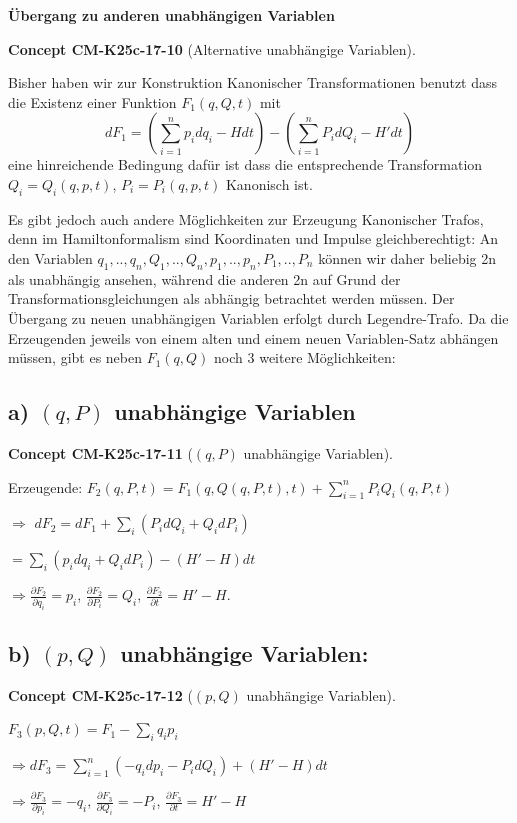 \documentclass[10pt, letterpaper]{article}
\newcommand{\CustomHeading}[3]{%
  \par\medskip\noindent%
  \textbf{#1 #2} \textnormal{(#3)}.\enskip%
}
\newenvironment{CONC}[2]{\begin{unitbox}\CustomHeading{Concept}{#1}{#2}}{\end{unitbox}}
\begin{document}
\textbf{Übergang zu anderen unabhängigen Variablen}

\begin{CONC}{CM-K25c-17-10}{Alternative unabhängige Variablen}
Bisher haben wir zur Konstruktion Kanonischer Transformationen benutzt dass die Existenz einer Funktion $F_1(q,Q,t)$ mit
\[dF_1 = \left(\sum_{i=1}^n p_i dq_i - H dt\right) - \left(\sum_{i=1}^n P_i dQ_i - H' dt\right)\]
eine hinreichende Bedingung dafür ist dass die entsprechende Transformation $Q_i = Q_i(q,p,t)$, $P_i = P_i(q,p,t)$ Kanonisch ist.

Es gibt jedoch auch andere Möglichkeiten zur Erzeugung Kanonischer Trafos, denn im Hamiltonformalism sind Koordinaten und Impulse gleichberechtigt: An den Variablen $q_1,..,q_n,Q_1,..,Q_n,p_1,..,p_n,P_1,..,P_n$ können wir daher beliebig 2n als unabhängig ansehen, während die anderen 2n auf Grund der Transformationsgleichungen als abhängig betrachtet werden müssen. Der Übergang zu neuen unabhängigen Variablen erfolgt durch Legendre-Trafo. Da die Erzeugenden jeweils von einem alten und einem neuen Variablen-Satz abhängen müssen, gibt es neben $F_1(q,Q)$ noch 3 weitere Möglichkeiten:
\end{CONC}

\subsection*{a) $(q,P)$ unabhängige Variablen}

\begin{CONC}{CM-K25c-17-11}{$(q,P)$ unabhängige Variablen}
Erzeugende: $F_2(q,P,t) = F_1(q,Q(q,P,t),t) + \sum_{i=1}^n P_i Q_i(q,P,t)$

$\Rightarrow$ $dF_2 = dF_1 + \sum_i (P_i dQ_i + Q_i dP_i)$

$= \sum_i (p_i dq_i + Q_i dP_i) - (H'-H)dt$

$\Rightarrow \frac{\partial F_2}{\partial q_i} = p_i$, $\frac{\partial F_2}{\partial P_i} = Q_i$, $\frac{\partial F_2}{\partial t} = H'-H$.
\end{CONC}
\subsection*{b) $(p,Q)$ unabhängige Variablen:}

\begin{CONC}{CM-K25c-17-12}{$(p,Q)$ unabhängige Variablen}
$F_3(p,Q,t) = F_1 - \sum_i q_i p_i$

$\Rightarrow dF_3 = \sum_{i=1}^n (-q_i dp_i - P_i dQ_i) + (H'-H)dt$

$\Rightarrow \frac{\partial F_3}{\partial p_i} = -q_i$, $\frac{\partial F_3}{\partial Q_i} = -P_i$, $\frac{\partial F_3}{\partial t} = H'-H$
\end{CONC}
\end{document}
